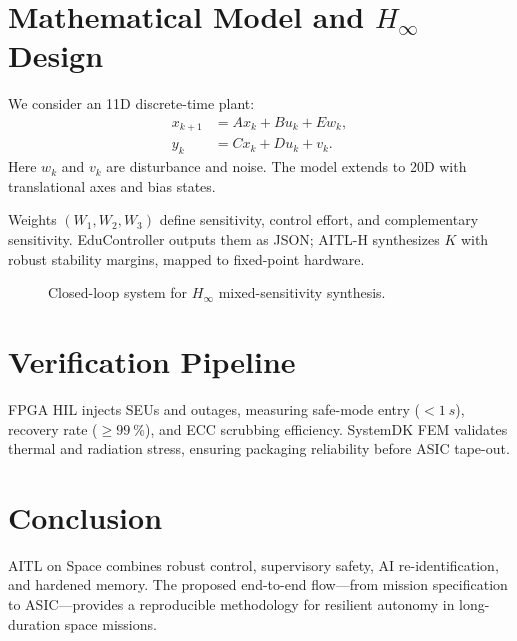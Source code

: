 \documentclass[conference]{IEEEtran}
\begin{document}
\section{Mathematical Model and $H_\infty$ Design}
We consider an 11D discrete-time plant:
\begin{align}
  x_{k+1} &= A x_k + B u_k + E w_k, \\
  y_k &= C x_k + D u_k + v_k.
\end{align}
Here $w_k$ and $v_k$ are disturbance and noise. The model extends to 20D with translational axes and bias states.  

Weights $(W_1,W_2,W_3)$ define sensitivity, control effort, and complementary sensitivity. EduController outputs them as JSON; AITL-H synthesizes $K$ with robust stability margins, mapped to fixed-point hardware.

\begin{figure}[t]
\centering
{}
\caption{Closed-loop system for $H_\infty$ mixed-sensitivity synthesis.}
\label{fig:loop}
\end{figure}

\section{Verification Pipeline}
FPGA HIL injects SEUs and outages, measuring safe-mode entry ($<\SI{1}{s}$), recovery rate ($\ge\SI{99}{\percent}$), and ECC scrubbing efficiency. SystemDK FEM validates thermal and radiation stress, ensuring packaging reliability before ASIC tape-out.

\section{Conclusion}
AITL on Space combines robust control, supervisory safety, AI re-identification, and hardened memory. The proposed end-to-end flow---from mission specification to ASIC---provides a reproducible methodology for resilient autonomy in long-duration space missions.
\end{document}
